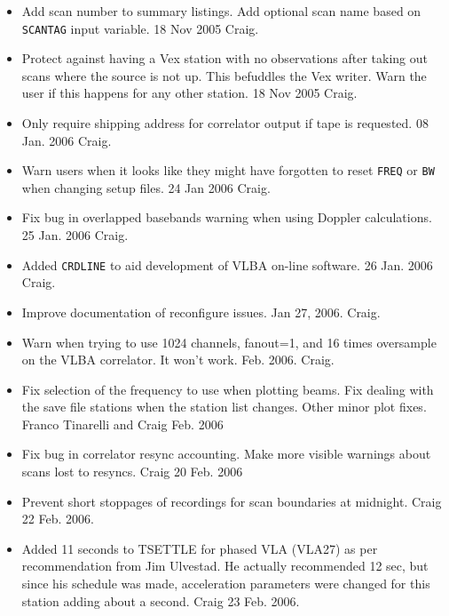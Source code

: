 \documentclass{report}
\begin{document}
\begin{itemize}
\item Add scan number to summary listings.  Add optional scan name based
on {\tt SCANTAG} input variable.  18 Nov 2005  Craig.

\item Protect against having a Vex station with no observations after taking
out scans where the source is not up.  This befuddles the Vex writer.  Warn
the user if this happens for any other station.  18 Nov 2005 Craig.

\item Only require shipping address for correlator output if tape is
requested.  08 Jan. 2006  Craig.

\item Warn users when it looks like they might have forgotten to reset
{\tt FREQ} or {\tt BW} when changing setup files.  24 Jan 2006 Craig.

\item Fix bug in overlapped basebands warning when using Doppler calculations.
25 Jan. 2006  Craig.

\item Added {\tt CRDLINE} to aid development of VLBA on-line software.
26 Jan. 2006  Craig.

\item Improve documentation of reconfigure issues.  Jan 27, 2006. Craig.

\item Warn when trying to use 1024 channels, fanout=1, and 16 times
oversample on the VLBA correlator.  It won't work.  Feb. 2006.  Craig.

\item Fix selection of the frequency to use when plotting beams.  Fix
dealing with the save file stations when the station list changes.  Other
minor plot fixes.  Franco Tinarelli and Craig  Feb. 2006

\item Fix bug in correlator resync accounting.  Make more visible
warnings about scans lost to resyncs.  Craig  20 Feb. 2006

\item Prevent short stoppages of recordings for scan boundaries at midnight.
Craig  22 Feb. 2006.

\item Added 11 seconds to TSETTLE for phased VLA (VLA27) as per
recommendation from Jim Ulvestad. He actually recommended 12 sec, but
since his schedule was made, acceleration parameters were changed for
this station adding about a second.  Craig 23 Feb. 2006.


\end{itemize}
\end{document}
